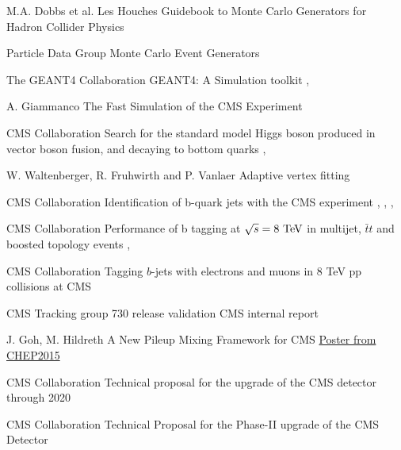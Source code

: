 {M.A. Dobbs et al.}
{Les Houches Guidebook to Monte Carlo Generators for Hadron Collider Physics}
{}

{Particle Data Group}
{Monte Carlo Event Generators}
{}

{The GEANT4 Collaboration}
{GEANT4: A Simulation toolkit}
{, }

{A. Giammanco}
{The Fast Simulation of the CMS Experiment}
{}


{CMS Collaboration}
{Search for the standard model Higgs boson produced in
vector boson fusion, and decaying to bottom quarks}
{, }

{W. Waltenberger, R. Fruhwirth and P. Vanlaer}
{Adaptive vertex fitting}
{}

{CMS Collaboration}
{Identification of b-quark jets with the CMS experiment}
{, , , }

{CMS Collaboration}
{Performance of b tagging at $\sqrt{s} = 8~\text{TeV}$ in multijet, $\bar{t}t$ and boosted topology events}
{, }

{CMS Collaboration}
{Tagging $b$-jets with electrons and muons in 8 TeV pp collisions at CMS}
{}

{CMS Tracking group}
{730 release validation}
{CMS internal report}

{J. Goh, M. Hildreth}
{A New Pileup Mixing Framework for CMS}
{\href{http://indico.cern.ch/event/304944/session/10/contribution/372/attachments/578591/796743/CHEP2015-premixing.pdf}{Poster from CHEP2015}}

{CMS Collaboration}
{Technical proposal for the upgrade of the CMS detector through 2020}
{}

{CMS Collaboration}
{Technical Proposal for the Phase-II upgrade of the CMS Detector}
{}

